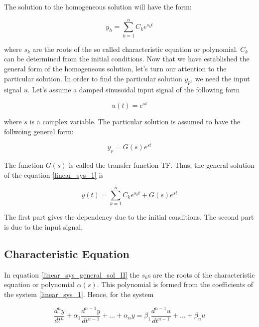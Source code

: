 The solution to the homogeneous solution will have the form:

\begin{equation}
y_h = \sum_{k=1}^{n} C_k e^{s_k t}  
\label{linear_sys_general_ho}
\end{equation}

where $s_k$ are the roots of the so called characteristic equation or polynomial.  $C_k$ can be determined from the initial conditions. Now that we have established the general form of the homogeneous
solution, let's turn our attention to the particular solution.  In order to find the particular solution $y_p$, we need the input signal $u$. Let's assume a damped sinusoidal input signal of the following form

\begin{equation}
u(t) = e^{st}  
\label{linear_sys_input}
\end{equation}

where $s$ is a complex variable.  The particular solution is assumed to have the follwoing general form:


\begin{equation}
y_p= G(s)e^{st}  
\label{linear_sys_general_pa}
\end{equation}

The function $G(s)$ is called the transfer function TF. Thus, the general solution of the equation \ref{linear_sys_1} is


\begin{equation}
y (t) = \sum_{k=1}^{n} C_k e^{s_k t} + G(s)e^{st}  
\label{linear_sys_general_sol_II}
\end{equation}

The first part gives the dependency due to the initial conditions. The second part is due to the input signal.


\subsection{Characteristic Equation}

In equation \ref{linear_sys_general_sol_II} the $s_k$s are the roots of the characteristic equation or polynomial $\alpha(s)$. This polynomial is formed from the coefficients of the system
\ref{linear_sys_1}. Hence, for the system

\begin{equation}
\frac{d^{n}y}{dt^{n}} + \alpha_{1}\frac{d^{n-1}y}{dt^{n-1}} + \dots + \alpha_{n}y = \beta_{1}\frac{d^{n-1}u}{dt^{n-1}} + \dots + \beta_{n}u  
\nonumber
\end{equation} 

